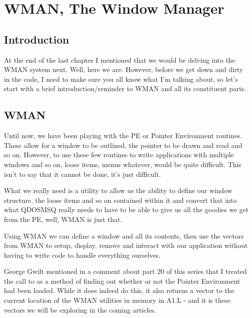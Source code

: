 \chapter{WMAN, The Window Manager}

\section{Introduction}
\label{ch22-intro}%

At the end of the last chapter I mentioned that we
    would be delving into the WMAN system next. Well, here we are. However,
    before we get down and dirty in the code, I need to make sure you all know
    what I'm talking about, so let's start with a brief introduction/reminder
    to WMAN and all its constituent parts.

\section{WMAN}
\label{ch22-wman}%

Until now, we have been playing with the PE or Pointer Environment
    routines. These allow for a window to be outlined, the pointer to be drawn
    and read and so on. However, to use these few routines to write
    applications with multiple windows and so on, loose items, menus whatever,
    would be quite difficult. This isn't to say that it cannot be done, it's
    just difficult.

What we really need is a utility to allow us the ability to define
    our window structure, the loose items and so on contained within it and
    convert that into what QDOSMSQ really needs to have to be able to give us
    all the goodies we get from the PE, well, WMAN is just that.

Using WMAN we can define a window and all its contents, then use
    the vectors from WMAN to setup, display, remove and interact with our
    application without having to write code to handle everything
    ourselves.

George Gwilt mentioned in a comment about part 20 of this series
    that I treated the call to  as a method of finding out whether or
    not the Pointer Environment had been loaded. While it does indeed do this,
    it also returns a vector to the current location of the WMAN utilities in
    memory in A1.L -{} and it is these vectors we will be exploring in the
    coming articles.

